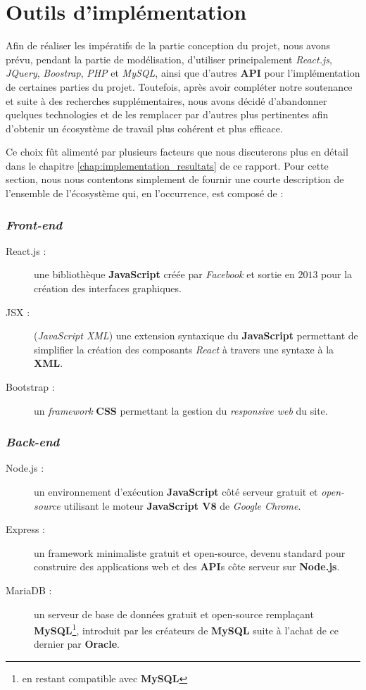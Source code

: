 \documentclass[a4paper,12pt]{report}
\theoremstyle{break}
\theoremstyle{break}
\theoremstyle{break}
\theoremstyle{break}
\theoremstyle{definition}
\theoremstyle{remark}
\begin{document}
\section{Outils d'implémentation}
Afin de réaliser les impératifs de la partie conception du projet, nous avons prévu, pendant la partie de modélisation, d'utiliser principalement \textit{React.js}, \textit{JQuery}, \textit{Boostrap}, \textit{PHP} et \textit{MySQL}, ainsi que d'autres \textbf{API} pour l'implémentation de certaines parties du projet. Toutefois, après avoir compléter notre soutenance et suite à des recherches supplémentaires, nous avons décidé d'abandonner quelques technologies et de les remplacer par d'autres plus pertinentes afin d'obtenir un écosystème de travail plus cohérent et plus efficace.

Ce choix fût alimenté par plusieurs facteurs que nous discuterons plus en détail dans le chapitre \ref{chap:implementation_resultats} de ce rapport. Pour cette section, nous nous contentons simplement de fournir une courte description de l'ensemble de l'écosystème qui, en l'occurrence, est composé de :

\subsubsection{\textit{Front-end}}
\begin{description}
  \item [React.js :] une bibliothèque \textbf{JavaScript} créée par \textit{Facebook} et sortie en $2013$ pour la création des interfaces graphiques.
  \item [JSX :] (\textit{JavaScript XML}) une extension syntaxique du \textbf{JavaScript} permettant de simplifier la création des composants \textit{React} à travers une syntaxe à la \textbf{XML}.
  \item [Bootstrap :] un \textit{framework} \textbf{CSS} permettant la gestion du \textit{responsive web} du site.
\end{description}

\subsubsection{\textit{Back-end}}
\begin{description}
  \item [Node.js :] un environnement d'exécution \textbf{JavaScript} côté serveur gratuit et \textit{open-source} utilisant le moteur \textbf{JavaScript V8} de \textit{Google Chrome}.
  \item [Express :] un framework minimaliste gratuit et open-source, devenu standard pour construire des applications web et des \textbf{API}s côte serveur sur \textbf{Node.js}.
  \item [MariaDB :] un serveur de base de données gratuit et open-source remplaçant \textbf{MySQL}\footnote{en restant compatible avec \textbf{MySQL}}, introduit par les créateurs de \textbf{MySQL} suite à l'achat de ce dernier par \textbf{Oracle}.
\end{description}
\end{document}
